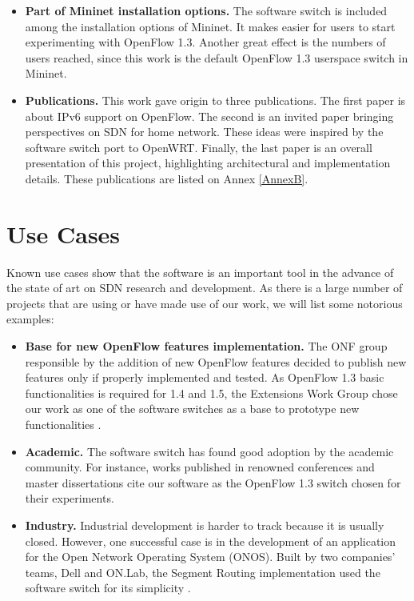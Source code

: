 \begin{itemize}
\item \textbf{Part of Mininet installation options.} The software switch is included among the installation options of Mininet. It makes easier for users to start experimenting with OpenFlow 1.3. Another great effect is the numbers of users reached, since this work is the default OpenFlow 1.3 userspace switch in Mininet.      

\item \textbf{Publications.} This work gave origin to three publications. The first paper is about IPv6 support on OpenFlow. The second is an invited paper bringing perspectives on SDN for home network. These ideas were inspired by the software switch port to OpenWRT. Finally, the last paper is an overall presentation of this project, highlighting architectural and implementation details. These publications are listed on Annex \ref{AnnexB}.  
\end{itemize}


\section{Use Cases}
\label{sec:cases}

Known use cases show that the software is an important tool in the advance of the state of art on SDN research and development. As there is a large number of projects that are using or have made use of our work, we will list some notorious examples: 

\begin{itemize}
\item \textbf{Base for new OpenFlow features implementation.} The ONF group responsible by the addition of new OpenFlow features decided to publish new features only if properly implemented and tested. As OpenFlow 1.3 basic functionalities is required for 1.4 and 1.5, the Extensions Work Group chose our work as one of the software switches as a base to prototype new functionalities \cite{ONFproto}. 

\item \textbf{Academic.} The software switch has found good adoption by the academic community. For instance, works published in renowned conferences \cite{Reitblatt:2013:FDF:2491185.2491187} \cite{Bianchi:2014:OPP:2602204.2602211} and master dissertations \cite{Paris} \cite{ShahmirShourmasti656472} cite our software as the OpenFlow 1.3 switch chosen for their experiments.  

\item \textbf{Industry.} Industrial development is harder to track because it is usually closed. However, one successful case is in the development of an application for the Open Network Operating System (ONOS). Built by two companies' teams, Dell and ON.Lab, the Segment Routing implementation used the software switch for its simplicity \cite{ONOS}.         
\end{itemize}

